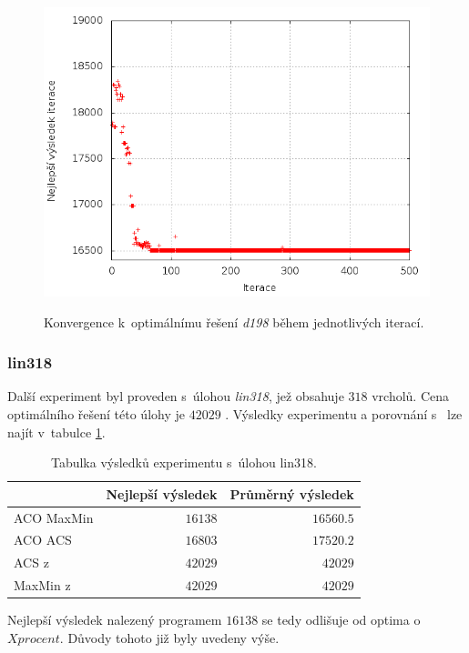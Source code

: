 \documentclass[a4paper, 12pt]{article}
\begin{document}
\begin{figure}[bt]
\begin{center}
\scalebox{0.6}
{
  \includegraphics{imgs/best.png}
}
\caption{
Konvergence k~optimálnímu řešení \emph{d198} během jednotlivých iterací.}
\label{fig:best}
\end{center}
\end{figure}

\subsubsection{lin318}
Další experiment byl proveden s~úlohou \emph{lin318}, jež obsahuje $318$ vrcholů. Cena optimálního řešení této úlohy je $42029$ \cite{aco:acs}. Výsledky experimentu
a porovnání s~\cite{aco:maxmintsp,aco:acs} lze najít v~tabulce \ref{tablin318}.
\begin{table}[tb]
\begin{center}
  \begin{tabular}{ | l | r | r |}
   \hline
    & \textbf{Nejlepší výsledek} & \textbf{Průměrný výsledek} \\ \hline \hline
    ACO MaxMin & $16138$ & $16560.5$ \\ \hline
    ACO ACS & $16803$ & $17520.2$ \\ \hline
    ACS z~\cite{aco:acs} & $42 029$ & $42 029$ \\ \hline
    MaxMin z~\cite{aco:maxmintsp} & $42 029$ & $42 029$\\ \hline
   \end{tabular}
   \caption{Tabulka výsledků experimentu s~úlohou lin318.}
   \label{tablin318}
\end{center}
\end{table}
Nejlepší výsledek nalezený programem $16138$ se tedy odlišuje od optima o~$X procent$. Důvody tohoto již byly uvedeny výše.
\end{document}
